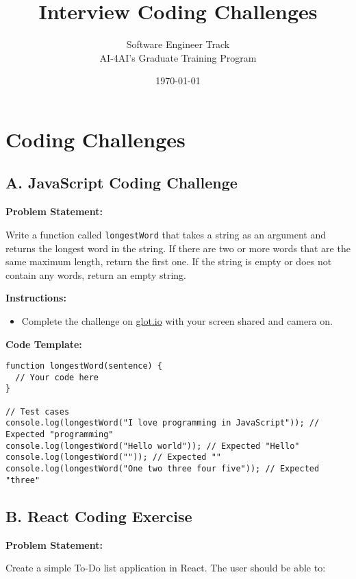 \documentclass[12pt]{article}
\title{
    \textbf{Interview Coding Challenges}
}
\author{Software Engineer Track \\ AI-4AI's Graduate Training Program}
\date{\today}
\begin{document}
\maketitle


\section{Coding Challenges}

\subsection{A. JavaScript Coding Challenge}

\textbf{Problem Statement:}

Write a function called \texttt{longestWord} that takes a string as an argument and returns the longest word in the string. If there are two or more words that are the same maximum length, return the first one. If the string is empty or does not contain any words, return an empty string.

\textbf{Instructions:}

\begin{itemize}
    \item Complete the challenge on \href{https://glot.io/new/javascript}{glot.io} with your screen shared and camera on.
\end{itemize}

\textbf{Code Template:}

\begin{lstlisting}[style=customjs, caption=JavaScript: longestWord Function]
function longestWord(sentence) {
  // Your code here
}

// Test cases
console.log(longestWord("I love programming in JavaScript")); // Expected "programming"
console.log(longestWord("Hello world")); // Expected "Hello"
console.log(longestWord("")); // Expected ""
console.log(longestWord("One two three four five")); // Expected "three"
\end{lstlisting}

\subsection{B. React Coding Exercise}

\textbf{Problem Statement:}

Create a simple To-Do list application in React. The user should be able to:
\end{document}

